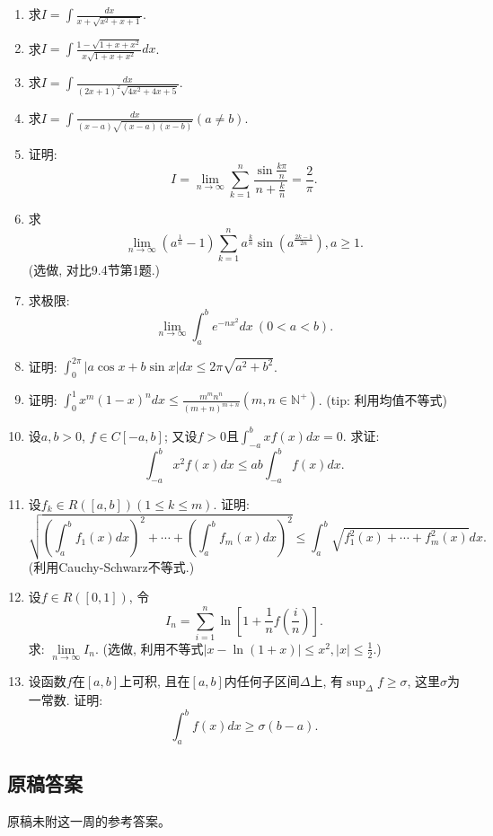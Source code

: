 \documentclass[UTF8,11pt, a4paper, oneside, fontset=none]{ctexbook}
\begin{document}
\begin{enumerate}
\item 求$I = \int \frac{dx}{x + \sqrt{x^2 + x + 1}}$.
\item 求$I = \int \frac{1 - \sqrt{1 + x + x^2}}{x \sqrt{1 + x + x^2}}dx$.
\item 求$I = \int \frac{dx}{(2x+1)^2 \sqrt{4x^2 + 4x + 5}}$.
\item 求$I = \int \frac{dx}{(x - a)\sqrt{(x-a)(x-b)}} (a \neq b)$.
\item 证明:
\[
I = \lim_{n \to \infty} \sum_{k=1}^n \frac{\sin \frac{k\pi}{n}}{ n + \frac{k}{n}} = \frac{2}{\pi}.
\]
\item 求
\[
\lim_{n \to \infty} (a^{\frac{1}{n}} -1 ) \sum_{k=1}^n a^{\frac{k}{n}} \sin \left( a^{\frac{2k-1}{2n}} \right), a \geq 1.
\]
(选做, 对比9.4节第1题.)
\item 求极限:
\[
\lim_{n \to \infty} \int_a^b e^{-nx^2} dx \ ( 0 < a < b).
\]
\item 证明: $\int_0^{2 \pi} | a \cos x + b \sin x| dx \leq 2 \pi \sqrt{a^2 + b^2}$.
\item 证明: $\int_0^1 x^m (1-x)^n dx \leq \frac{m^m n^n}{(m+n)^{m+n}} (m, n \in \mathbb N^+)$. (tip: 利用均值不等式)
\item 设$a, b >0$, $f \in C[-a, b]$; 又设$f > 0$且$\int_{-a}^b x f(x) dx =0$. 求证:
\[
\int_{-a}^b x^2 f(x) dx \leq ab \int_{-a}^b f(x) dx.
\]
\item 设$f_k \in R([a, b]) (1 \leq k \leq m)$. 证明:
\[
\sqrt{ \left( \int_a^b f_1(x)dx \right)^2 + \cdots +  \left( \int_a^b f_m(x)dx \right)^2   } \leq \int_a^b \sqrt{f_1^2(x) + \cdots + f_m^2(x)} dx.
\]
(利用Cauchy-Schwarz不等式.)
\item 设$f \in R([0, 1])$, 令
\[
I_n = \sum_{i=1}^n \ln \left[ 1 + \frac{1}{n}f\left( \frac{i}{n} \right) \right].
\]
求: $\lim\limits_{n \to \infty} I_n$.
(选做, 利用不等式$|x - \ln (1+x) | \leq x^2, |x| \leq \frac{1}{2}$.)
\item 设函数$f$在$[a, b]$上可积, 且在$[a, b]$内任何子区间$\Delta$上, 有$\sup_{\Delta} f \geq \sigma $, 这里$\sigma$为一常数. 证明:
\[
\int_a^b f(x) dx \geq \sigma (b-a).
\]
\end{enumerate}

\clearpage

\subsection*{原稿答案}

\noindent 原稿未附这一周的参考答案。
\end{document}
